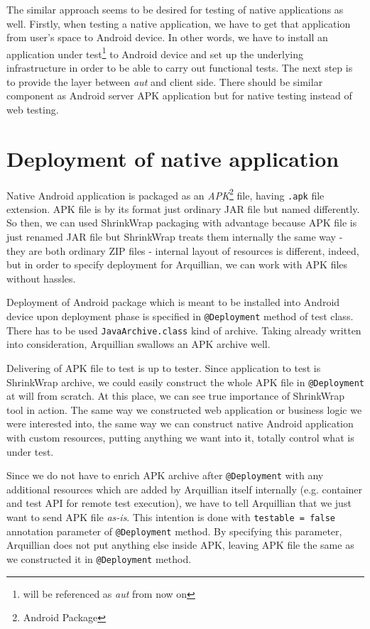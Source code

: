 \documentclass[12pt,final,oneside]{fithesis}
\begin{document}
The similar approach seems to be desired for testing of native applications as well. Firstly, when testing a native application, we have to get that application from user's space to Android device. In other words, we have to install an application under test\footnote{will be referenced as \textit{aut} from now on} to Android device and set up the underlying infrastructure in order to be able to carry out functional tests. The next step is to provide the layer between \textit{aut} and client side. There should be similar component as Android server APK application but for native testing instead of web testing.

	\section{Deployment of native application}

Native Android application is packaged as an \textit{APK}\footnote{Android Package} file, having \texttt{.apk} file extension. APK file is by its format just ordinary JAR file but named differently. So then, we can used ShrinkWrap packaging with advantage because APK file is just renamed JAR file but ShrinkWrap treats them internally the same way - they are both ordinary ZIP files - internal layout of resources is different, indeed, but in order to specify deployment for Arquillian, we can work with APK files without hassles.

Deployment of Android package which is meant to be installed into Android device upon deployment phase is specified in \texttt{@Deployment} method of test class. There has to be used \texttt{JavaArchive.class} kind of archive. Taking already written into consideration, Arquillian swallows an APK archive well.

Delivering of APK file to test is up to tester. Since application to test is ShrinkWrap archive, we could easily construct the whole APK file in \texttt{@Deployment} at will from scratch. At this place, we can see true importance of ShrinkWrap tool in action. The same way we constructed web application or business logic we were interested into, the same way we can construct native Android application with custom resources, putting anything we want into it, totally control what is under test.

Since we do not have to enrich APK archive after \texttt{@Deployment} with any additional resources which are added by Arquillian itself internally (e.g. container and test API for remote test execution), we have to tell Arquillian that we just want to send APK file \textit{as-is}. This intention is done with \texttt{testable = false} annotation parameter of \texttt{@Deployment} method. By specifying this parameter, Arquillian does not put anything else inside APK, leaving APK file the same as we constructed it in \texttt{@Deployment} method.
\end{document}
